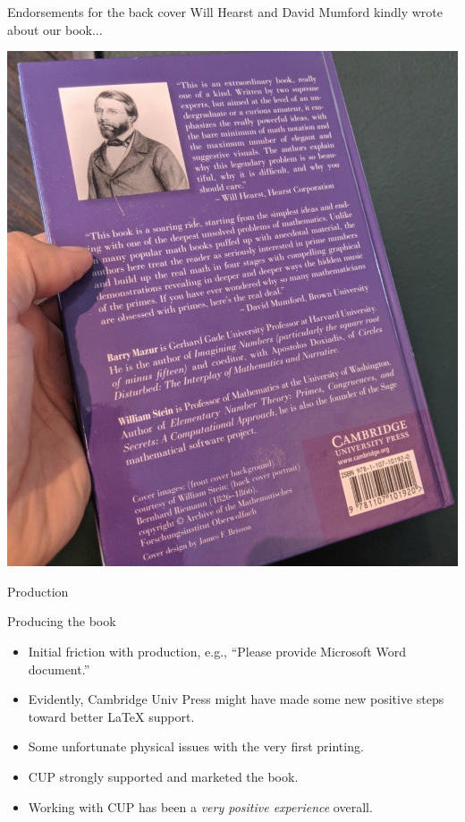 \documentclass{beamer}
\begin{document}
\begin{frame}{Endorsements for the back cover}
  Will Hearst and David Mumford kindly wrote about our book...

  \begin{center}
    \includegraphics[height=.76\textheight]{pics/cover-back}
  \end{center}
\end{frame}

\begin{frame}{Production}
  \begin{block}{Producing the book}
    \begin{itemize}
      \item Initial friction with production, e.g., ``Please provide Microsoft Word document.''
      \item Evidently, Cambridge Univ Press might have made some new positive steps toward better \LaTeX{} support.
      \item Some unfortunate physical issues with the very first printing.
      \item CUP strongly supported and marketed the book.
      \item Working with CUP has been a {\em very positive experience} overall.
    \end{itemize}
  \end{block}
\end{frame}
\end{document}
